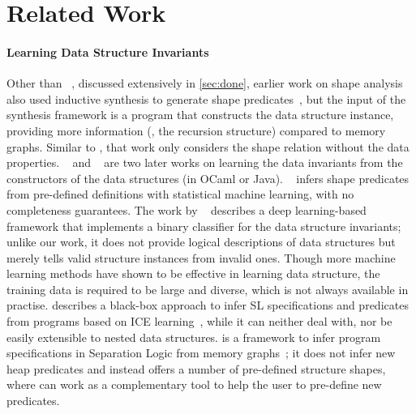 \section{Related Work}
\label{sec:related}


\paragraph{Learning Data Structure Invariants} 
%
%
%
%


Other than \shape~\cite{LPAR23:Learning_Data_Structure_Shapes},
discussed extensively in \autoref{sec:done}, earlier work on shape
analysis also used inductive synthesis to generate shape
predicates~\cite{guo2007shape}, but the input of the synthesis
framework is a program that constructs the data structure instance,
providing more information (\eg, the recursion structure) compared to
memory graphs.
%
Similar to \shape, that work only considers the shape relation without
the data properties. ~\cite{zhu2016automatically} and
~\cite{molina2021evospex} are two later works on
learning the data invariants from the constructors of the data
structures (in OCaml or Java).
~\cite{brockschmidt2017learning} infers shape predicates
from pre-defined definitions with statistical machine learning, with
no completeness guarantees. The work by
\citeauthor{molina2019training}~\cite{molina2019training} describes a deep learning-based
framework that implements a binary classifier for the data structure
invariants; unlike our work, it does not
provide logical descriptions of data structures but merely tells valid
structure instances from invalid ones. Though more machine learning
methods \cite{DBLP:conf/spin/UsmanWWYDK19} have shown to be effective
in learning data structure, the training data is required to be large
and diverse, which is not always available in practise.
\citet{DBLP:phd/basesearch/Dohrau22} describes a black-box approach to
infer SL specifications and predicates from programs based on ICE
learning~\cite{garg2014ice}, while it can neither deal with, nor be
easily extensible to nested data structures.  is a
framework to infer program specifications in Separation Logic from
memory graphs~\cite{le2019sling}; it does not infer new heap
predicates and instead offers a number of pre-defined structure
shapes, where \tool can work as a complementary tool to help the user
to pre-define new predicates.

